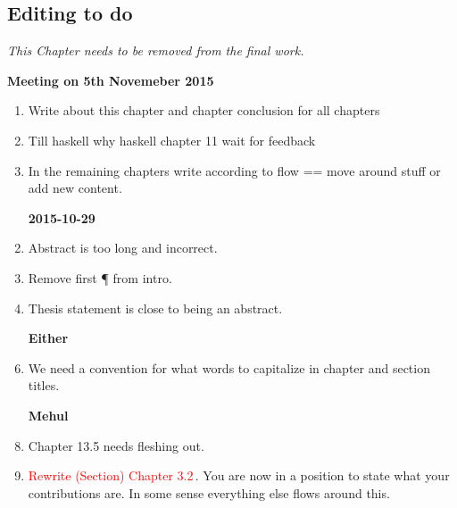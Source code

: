 
\begin{scope}
\nolinenumbers
\chapter{Editing to do}\label{chap:to-do}

\textit{\color{red} This Chapter needs to be removed from the final
  work.}

\textbf{Meeting on 5th Novemeber 2015} 
\begin{enumerate}
\item Write about this chapter and chapter conclusion for all chapters

\item Till haskell why haskell chapter 11 wait for feedback

\item In the remaining chapters write according to flow == move around stuff or add new content.
\end{enumerate}

\begin{enumerate}
\item [\textbf{2015-10-29}]
\item Abstract is too long and incorrect.
\item Remove first \P{} from intro.
\item Thesis statement is close to being an abstract.

\item [\textbf{Either}]
\item
  We need a convention for what words to capitalize in chapter and
  section titles.

\item [\textbf{Mehul}]

\item
  Chapter 13.5 needs fleshing out.

\item
  \textcolor{red}{Rewrite (Section) Chapter 3.2}\,.
  You are now in a position to state what your contributions are.
  In some sense everything else flows around this.


\end{enumerate}
\end{scope}
